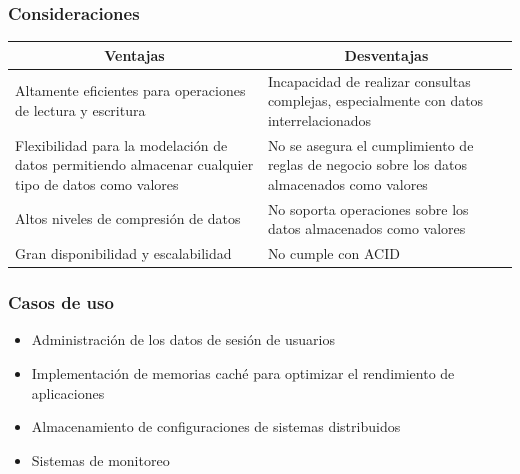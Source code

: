 \begin{frame}
    \frametitle{Consideraciones}

    \begin{table}[h!]
        \centering
        \begin{tabular}{|p{}|p{}|}
        \hline
        \multicolumn{1}{|c|}{\cellcolor{green1} \textbf{Ventajas}} &  \multicolumn{1}{|c|}{ \cellcolor{red1} \textbf{Desventajas}} \\ \hline
        Altamente eficientes para operaciones de lectura y escritura & Incapacidad de realizar consultas complejas, especialmente con datos interrelacionados \\ \hline
        Flexibilidad para la modelación de datos permitiendo almacenar cualquier tipo de datos como valores & No se asegura el cumplimiento de reglas de negocio sobre los datos almacenados como valores \\ \hline
        Altos niveles de compresión de datos & No soporta operaciones sobre los datos almacenados como valores \\ \hline
        Gran disponibilidad y escalabilidad & No cumple con ACID \\ \hline
        \end{tabular}
    \end{table}

\end{frame}


\begin{frame}
    \frametitle{Casos de uso}

    \begin{itemize}
        \item Administración de los datos de sesión de usuarios
        \item Implementación de memorias caché para optimizar el rendimiento de aplicaciones
        \item Almacenamiento de configuraciones de sistemas distribuidos
        \item Sistemas de monitoreo
    \end{itemize}

\end{frame}



